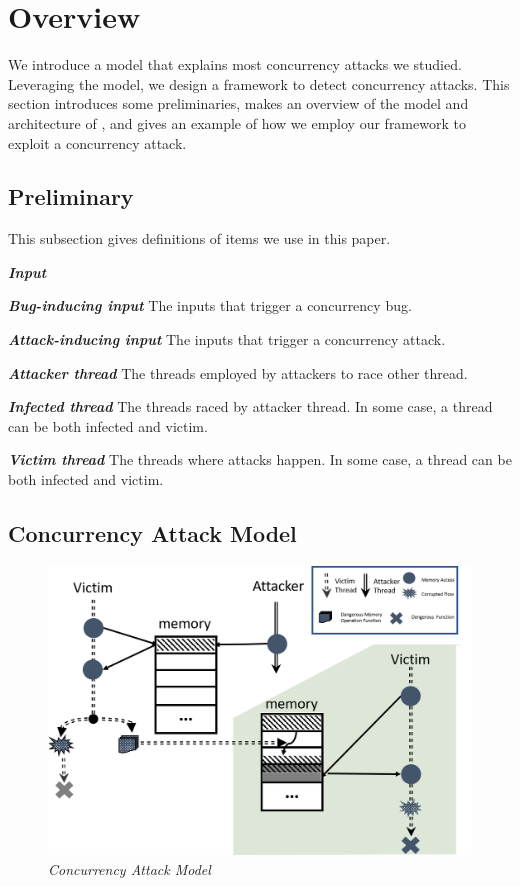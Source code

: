
\section{Overview}\label{sec:overview}
We introduce a model that explains most concurrency attacks we studied. 
Leveraging the model, we design a framework \xxx
to detect concurrency attacks. 
This section introduces some preliminaries, 
makes an overview of the model and architecture of \xxx, 
and gives an example of how we employ our framework to exploit a concurrency attack. 

\subsection{Preliminary}\label{sec:preliminary}

This subsection gives definitions of items we use in this paper.

\emph{\textbf{Input}}

\emph{\textbf{Bug-inducing input}} The inputs that trigger a concurrency bug. 

\emph{\textbf{Attack-inducing input}} The inputs that trigger a concurrency attack.

\emph{\textbf{Attacker thread}} The threads employed by attackers to race other thread.

\emph{\textbf{Infected thread}} The threads raced by attacker thread. In some case, a thread 
can be both infected and victim.

\emph{\textbf{Victim thread}} The threads where attacks happen. In some case, a thread 
can be both infected and victim.


\subsection{Concurrency Attack Model}\label{sec:model}

\begin{figure}
	\centering
	\includegraphics[width=1\columnwidth]{figures/model}
	\vspace{-.25in}
	\caption{{\em Concurrency Attack Model}} 
	\label{fig:model}
	\vspace{-0.1in}
\end{figure}




